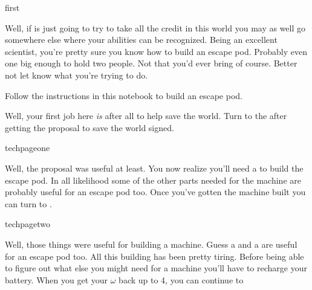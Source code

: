 \documentclass[greennotebook]{guildcamp3} %
\begin{document}
\startnotebook{\nEscapePodTech{}}



\begin{page}{first}
	
Well, if \cSciOne{} is just going to try to take all the credit in this world you may as well go somewhere else where your abilities can be recognized. Being an excellent scientist, you're pretty sure you know how to build an escape pod. Probably even one big enough to hold two people. Not that you'd ever bring \cSciOne{} of course. Better not let \cSciOne{\them} know what you're trying to do. 

Follow the instructions in this notebook to build an escape pod. 

Well, your first job here \emph{is} after all to help save the world. Turn to the  after getting the proposal to save the world signed. 

\end{page}



\begin{page}{techpageone}

Well, the proposal was useful at least. You now realize you'll need a \iFishingNet{} to build the escape pod. In all likelihood some of the other parts needed for the machine are probably useful for an escape pod too. Once you've gotten the machine built you can turn to .

\end{page}

\begin{page}{techpagetwo}
	
Well, those things were useful for building a machine. Guess a \iCircuitBoard{} and a \iCog{} are useful for an escape pod too. All this building has been pretty tiring. Before being able to figure out what else you might need for a machine you'll have to recharge your battery. When you get your $\omega$ back up to 4, you can continue to 
	
\end{page}
\end{document}
